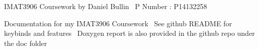 I\+M\+A\+T3906 Coursework by Daniel Bullin~\newline
P Number \+: P14132258

Documentation for my I\+M\+A\+T3906 Coursework~\newline
See github R\+E\+A\+D\+ME for keybinds and features~\newline
Doxygen report is also provided in the github repo under the doc folder 